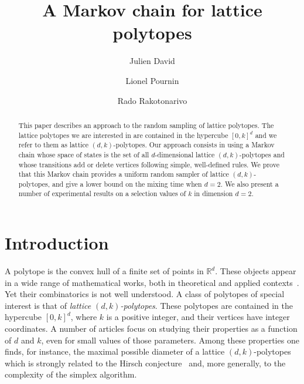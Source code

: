 \documentclass[a4paper]{article}
\begin{document}
\title{A Markov chain for lattice polytopes}
\author[1]{Julien David}
\author[1]{Lionel Pournin}
\author[1]{Rado Rakotonarivo}
\date{}
\maketitle

\begin{abstract}
This paper describes an approach to the random sampling of lattice polytopes. The lattice polytopes we are interested in are contained in the hypercube $[0,k]^d$ and we refer to them as lattice $(d,k)$-polytopes. Our approach consists in using a Markov chain whose space of states is the set of all $d$-dimensional lattice $(d,k)$-polytopes and whose transitions add or delete vertices following simple, well-defined rules. We prove that this Markov chain provides a uniform random sampler of lattice $(d, k)$-polytopes, and give a lower bound on the mixing time when $d=2$. We also present a number of experimental results on a selection values of $k$ in dimension $d=2$.
\end{abstract}

\section{Introduction}

A polytope is the convex hull of a finite set of points in $\mathbb{R}^d$. These objects appear in a wide range of mathematical works, both in theoretical and applied contexts~\cite{ziegler1995lectures}. Yet their combinatorics is not well understood. A class of polytopes of special interest is that of \emph{lattice $(d,k)$-polytopes}. These polytopes are contained in the hypercube $[0,k]^d$, where $k$ is a positive integer, and their vertices have integer coordinates. A number of articles focus on studying their properties as a function of $d$ and $k$, even for small values of those parameters. Among these properties one finds, for instance, the maximal possible diameter of a lattice $(d,k)$-polytopes~\cite{DelPiaMichini2016,DezaManoussakisOnn2018,DezaPournin2018,KleinschmidtOnn1992,Naddef1989} which is strongly related to the Hirsch conjecture~\cite{BonifasDiSummaEisenbrandHahnleNiemeier2014,BorgwardtDeLoeraFinhold2016,KalaiKleitman1992,KleeWalkup1967,Santos2012} and, more generally, to the complexity of the simplex algorithm.
\end{document}
